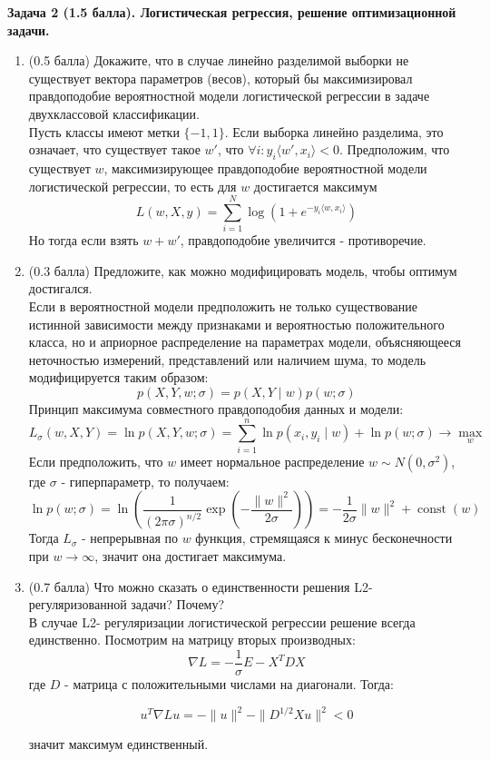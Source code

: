 \documentclass[10pt]{article}
\begin{document}
\textbf{Задача 2 (1.5 балла). Логистическая регрессия, решение оптимизационной задачи.} \\
\begin{enumerate}
    \item{(0.5 балла)} Докажите, что в случае линейно разделимой выборки не существует вектора параметров (весов), который бы максимизировал правдоподобие вероятностной модели логистической регрессии в задаче двухклассовой классификации.\\
   Пусть классы имеют метки $\{-1, 1\}$. Если выборка линейно разделима, это означает, что существует такое $w'$, что 
   $\forall i : y_{i}\langle w', x_{i}\rangle < 0 $. Предположим, что существует $w$, максимизирующее правдоподобие вероятностной модели логистической регрессии, то есть для $w$ достигается максимум\\
    $$L(w, X, y)=\sum_{i=1}^{N} \log \left(1+e^{-y_{i}\langle w, x_{i}\rangle}\right)$$
    Но тогда если взять $w + w'$, правдоподобие увеличится - противоречие.
    \item{(0.3 балла)} Предложите, как можно модифицировать модель, чтобы оптимум достигался. \\
    Если в вероятностной модели предположить не только существование истинной зависимости между признаками и вероятностью положительного класса, но и априорное распределение на параметрах модели, объясняющееся неточностью измерений, представлений или наличием шума, то модель модифицируется таким образом:\\
    $$
    p\left(X, Y, w ; \sigma \right)=p\left(X, Y \mid w\right) p(w ; \sigma)
    $$
	Принцип максимума совместного правдоподобия данных и модели:
    $$
    L_{\sigma}\left(w, X, Y\right)=\ln p\left(X, Y, w ; \sigma \right)=\sum_{i=1}^{n} \ln p\left(x_{i}, y_{i} \mid w\right)+\ln p(w ; \sigma) \rightarrow \max _{w}
    $$
	Если предположить, что $w$ имеет нормальное распределение $
    w \sim N\left(0, \sigma^{2}\right)
    $, где  $\sigma$ - гиперпараметр, то получаем:\\
    $$
    \ln p(w ; \sigma)=\ln \left(\frac{1}{(2 \pi \sigma)^{n / 2}} \exp \left(-\frac{\|w\|^{2}}{2 \sigma}\right)\right)=-\frac{1}{2 \sigma}\|w\|^{2}+\operatorname{const}(w)
    $$
    Тогда $L_{\sigma}$ - непрерывная по $w$ функция, стремящаяся к минус бесконечности при $w \rightarrow \infty$, значит она достигает максимума.
    
    \item{(0.7 балла)} Что можно сказать о единственности решения L2-регуляризованной задачи? Почему?\\
    В случае L2- регуляризации логистической регрессии решение всегда единственно. Посмотрим на матрицу вторых производных:\\
    $$\nabla L = -\frac{1}{\sigma}E - X^T DX$$
    где $D$ - матрица с положительными числами на диагонали. Тогда:
    
    $$u^T \nabla L u = -\|u\|^{2} - \|D^{1/2}Xu\|^2 < 0$$
    
    значит максимум единственный.
\end{enumerate}
\end{document}
